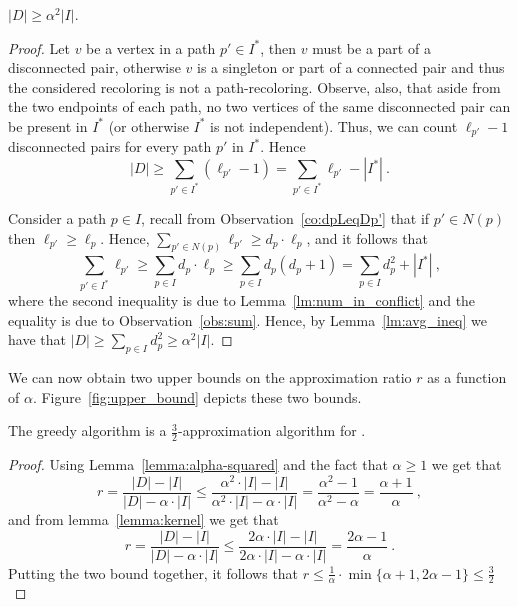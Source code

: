 \begin{lemma}
\label{lemma:alpha-squared}
$|D| \geq \alpha^2|I|$.
\end{lemma}
\begin{proof}
Let $v$ be a vertex in a path $p' \in I^*$, then $v$ must be a part of
a disconnected pair, otherwise $v$ is a singleton or part of a
connected pair and thus the considered recoloring is not a
path-recoloring.  Observe, also, that aside from the two endpoints of
each path, no two vertices of the same disconnected pair can be
present in $I^*$ (or otherwise $I^*$ is not independent).  Thus, we
can count $\ell_{p'} - 1$ disconnected pairs for every path $p'$ in
$I^*$.  Hence
\[
|D| \geq \sum_{p' \in I^*} (\ell_{p'} - 1) = \sum_{p' \in I^*}{\ell_{p'}} -
|I^*| ~.
\]

Consider a path $p \in I$, 
recall from Observation~\ref{co:dpLeqDp'} that if $p' \in N(p)$ 
then $\ell_{p'} \geq \ell_p$.
%
Hence, 
$\sum_{p' \in N(p)}{\ell_{p'}} \geq d_p \cdot \ell_p$, 
and it follows that
\[
\sum_{p' \in I^*} \ell_{p'}
\geq \sum_{p \in I} d_p \cdot \ell_p
\geq \sum_{p \in I} d_p(d_p+1)
=    \sum_{p \in I} d_p^2 + |I^*|
~,
\]
where the second inequality is due to Lemma~\ref{lm:num_in_conflict}
and the equality is due to Observation~\ref{obs:sum}.
Hence, by Lemma~\ref{lm:avg_ineq} we have that
\(
|D| \geq \sum_{p \in I} d_p^2 \geq \alpha^2 |I|
\).
{}\end{proof}

We can now obtain two upper bounds on the approximation ratio $r$ as a
function of $\alpha$. Figure~\ref{fig:upper_bound} depicts these two bounds.

\begin{theorem}
The greedy algorithm is a $\frac{3}{2}$-approximation algorithm for
\TWOCR{}.
\end{theorem}
\begin{proof}
Using Lemma~\ref{lemma:alpha-squared} and the fact that $\alpha \geq 1$ we get
that
$$
r
=    \frac{|D| - |I|}{|D| - \alpha \cdot |I|}
\leq \frac{\alpha ^ 2 \cdot |I| - |I|}{\alpha ^ 2 \cdot |I| - \alpha \cdot |I|}
=    \frac{\alpha ^ 2 - 1}{\alpha ^ 2 - \alpha}
=    \frac{\alpha+1}{\alpha}
~, 
$$
and from lemma~\ref{lemma:kernel} we get that
$$
r
=    \frac{|D| - |I|}{|D| - \alpha \cdot |I|}
\leq \frac{2 \alpha \cdot |I| - |I|}{2 \alpha \cdot |I| - \alpha \cdot |I|}
=    \frac{2 \alpha - 1}{\alpha}
~.
$$
Putting the two bound together, it follows that
\(
r
\leq \frac{1}{\alpha} \cdot \min\{\alpha+1,2\alpha-1\}
\leq    \frac{3}{2}
\){}
\end{proof}



